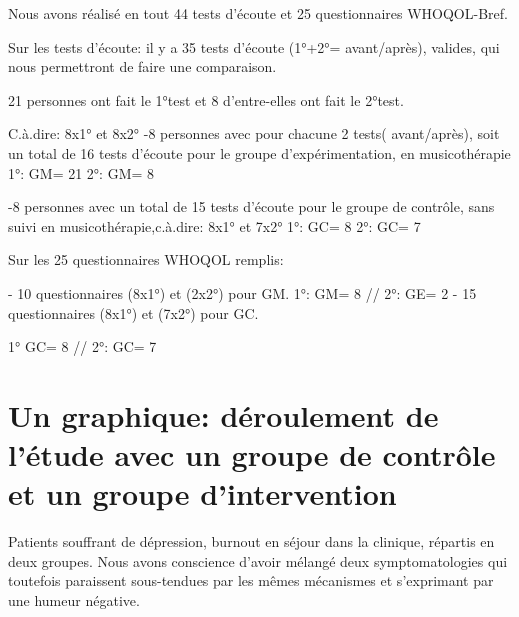         
     Nous avons réalisé en tout 44 tests d'écoute et 25 questionnaires 
     WHOQOL-Bref.
     
     Sur les tests d'écoute: il y a 35 tests d'écoute (1°+2°=
     avant/après), valides, qui nous permettront de faire une
     comparaison.

     
     21 personnes ont fait le 1°test et 8 d'entre-elles ont fait le
     2°test.

     C.à.dire: 8x1° et 8x2°
     -8 personnes avec pour chacune 2 tests( avant/après), soit  un
     total de 16 tests d'écoute pour le groupe d'expérimentation, en musicothérapie
     1°: GM= 21
     2°: GM= 8
     
     -8 personnes avec un total de 15 tests d'écoute pour le groupe de contrôle, sans suivi en 
     musicothérapie,c.à.dire: 8x1° et 7x2°
     1°: GC= 8
     2°: GC= 7

     
           Sur les 25  questionnaires WHOQOL remplis:
           
     - 10 questionnaires (8x1°) et (2x2°) pour GM.
     1°: GM= 8           //             2°: GE= 2
     - 15 questionnaires (8x1°) et (7x2°) pour GC.
    
     1° GC= 8             //            2°: GC= 7
     
     
    
 
     
          
 
 
 	
 	
       

 	
 	\section{Un graphique: déroulement de l'étude avec un groupe
          de contrôle et un groupe d'intervention}





                                      Patients souffrant de dépression, burnout
                                               en séjour dans la
                                               clinique, répartis en
                                               deux groupes.
                                               Nous avons conscience
                                               d'avoir mélangé deux
                                               symptomatologies qui
                                               toutefois paraissent
                                               sous-tendues par les
                                               mêmes mécanismes et
                                               s'exprimant par une
                                               humeur négative.

